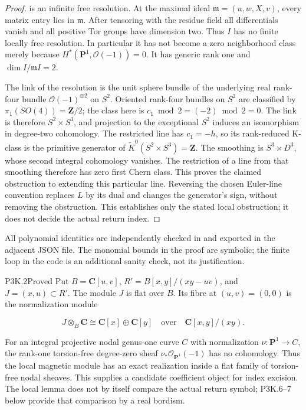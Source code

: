 \begin{proof}
is an infinite free resolution.  At the maximal ideal
\(\mathfrak m=(u,w,X,v)\), every matrix entry lies in \(\mathfrak m\).
After tensoring with the residue field all differentials vanish and
all positive Tor groups have dimension two.  Thus \(I\) has no finite
locally free resolution.  In particular it has not become a zero
neighborhood class merely because \(H^*(\mathbf P^1,\mathcal O(-1))=0\).
It has generic rank one and \(\dim I/\mathfrak m I=2\).

The link of the resolution is the unit sphere bundle of the underlying
real rank-four bundle \(\mathcal O(-1)^{\oplus2}\) on \(S^2\).  Oriented
rank-four bundles on \(S^2\) are classified by
\(\pi_1(SO(4))=\mathbf Z/2\); the class here is
\(c_1\bmod2=(-2)\bmod2=0\).  The link is therefore \(S^2\times S^3\),
and projection to the exceptional \(S^2\) induces an isomorphism in
degree-two cohomology.  The restricted line has \(c_1=-h\), so its
rank-reduced K-class is the primitive generator of
\(\widetilde K^0(S^2\times S^3)=\mathbf Z\).  The smoothing is
\(S^3\times D^3\), whose second integral cohomology vanishes.  The
restriction of a line from that smoothing therefore has zero first
Chern class.  This proves the claimed obstruction to extending this
particular line.  Reversing the chosen Euler-line convention replaces
\(L\) by its dual and changes the generator's sign, without removing
the obstruction.  This establishes only the stated local obstruction;
it does not decide the actual return index.
\end{proof}

All polynomial identities are independently checked in
 and exported in the adjacent
JSON file.  The monomial bounds in the proof are symbolic; the finite
loop in the code is an additional sanity check, not its justification.

\begin{statement}{P3K.2}{Proved}
Put \(B=\mathbf C[u,v]\),
\(R'=B[x,y]/(xy-uv)\), and \(J=(x,u)\subset R'\).
The module \(J\) is flat over \(B\).  Its fibre at \((u,v)=(0,0)\) is
the normalization module

\[
 J\otimes_B\mathbf C\cong
 \mathbf C[x]\oplus\mathbf C[y]
 \quad\text{over}\quad\mathbf C[x,y]/(xy).
\]

For an integral projective nodal genus-one curve \(C\) with
normalization \(\nu:\mathbf P^1\to C\), the rank-one torsion-free
degree-zero sheaf \(\nu_*\mathcal O_{\mathbf P^1}(-1)\) has no
cohomology.  Thus the local magnetic module has an exact realization
inside a flat family of torsion-free nodal sheaves.  This supplies a
candidate coefficient object for index excision.  The local lemma
does not by itself compare the actual return symbol; P3K.6–7 below
provide that comparison by a real bordism.
\end{statement}

